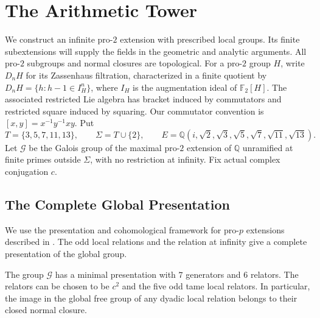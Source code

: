 \section{The Arithmetic Tower}\label{tw:tower}
We construct an infinite pro-$2$ extension with prescribed local groups.
Its finite subextensions will supply the fields in the geometric and
analytic arguments. All pro-$2$ subgroups and normal closures are topological. For a pro-$2$
group $H$, write $D_nH$ for its Zassenhaus filtration, characterized in a
finite quotient by $D_nH=\{h:h-1\in I_H^n\}$, where $I_H$ is the
augmentation ideal of $\mathbb F_2[H]$. The associated restricted Lie
algebra has bracket induced by commutators and restricted square induced
by squaring. Our commutator convention is $[x,y]=x^{-1}y^{-1}xy$.
Put
\[
 T=\{3,5,7,11,13\},\qquad \Sigma=T\cup\{2\},\qquad
 E=\mathbb Q(i,\sqrt2,\sqrt3,\sqrt5,\sqrt7,\sqrt{11},\sqrt{13}).
\]
Let $\mathcal G$ be the Galois group of the maximal pro-$2$ extension of
$\mathbb Q$ unramified at finite primes outside $\Sigma$, with no
restriction at infinity. Fix actual complex conjugation $c$.

\subsection{The Complete Global Presentation}
We use the presentation and cohomological framework for pro-$p$
extensions described in \cite{Koch2002,NeukirchSchmidtWingberg2008}.
The odd local relations and the relation at infinity give a complete
presentation of the global group.
\begin{lemma}\label{tw:complete-global-presentation}
The group $\mathcal G$ has a minimal presentation with $7$
generators and $6$ relators.  The relators can be chosen to be $c^2$ and
the five odd tame local relators.  In particular, the image in the global
free group of any dyadic local relation belongs to their closed normal
closure.
\end{lemma}

